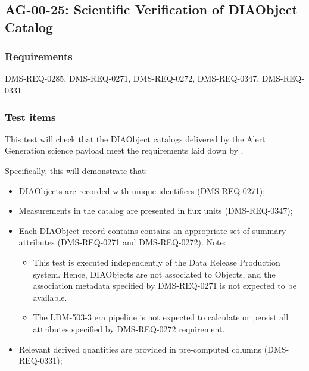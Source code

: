 \subsection{AG-00-25: Scientific Verification of DIAObject Catalog}
\label{ag-00-25}

\subsubsection{Requirements}

DMS-REQ-0285, DMS-REQ-0271, DMS-REQ-0272, DMS-REQ-0347, DMS-REQ-0331

\subsubsection{Test items}
\label{ag-00-25-items}

This test will check that the DIAObject catalogs delivered by the Alert
Generation science
payload meet the requirements laid down by .

Specifically, this will demonstrate that:

\begin{itemize}

  \item{DIAObjects are recorded with unique identifiers (DMS-REQ-0271);}

  \item{Measurements in the catalog are presented in flux units (DMS-REQ-0347);}

  \item{Each DIAObject record contains contains an appropriate set of summary
  attributes (DMS-REQ-0271 and DMS-REQ-0272). Note:

    \begin{itemize}

      \item{This test is executed independently of the Data Release Production
      system. Hence, DIAObjects are not associated to Objects, and the
      association metadata specified by DMS-REQ-0271 is not expected to be
      available.}

      \item{The LDM-503-3 era pipeline is not expected to calculate or persist
      all attributes specified by DMS-REQ-0272 requirement.}

    \end{itemize}
  }

  \item{Relevant derived quantities are provided in pre-computed columns (DMS-REQ-0331);}

\end{itemize}


